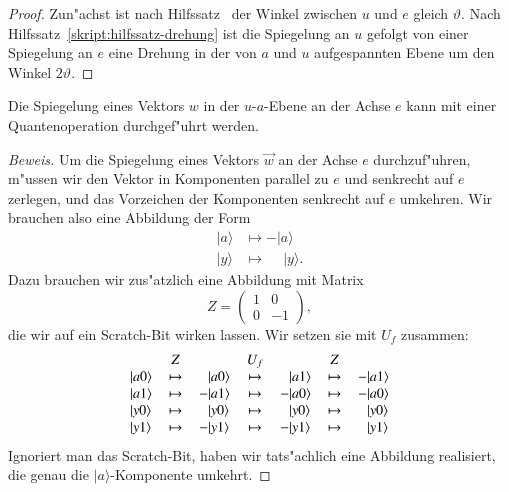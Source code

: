 \begin{proof}
Zun"achst ist nach Hilfssatz~\label{skript:hilfssatz-winkel}
der Winkel zwischen $u$ und $e$ gleich $\vartheta$.
Nach Hilfssatz~\ref{skript:hilfssatz-drehung} ist die Spiegelung
an $u$ gefolgt von einer Spiegelung an $e$ eine Drehung in der
von $a$ und $u$ aufgespannten Ebene um den Winkel $2\vartheta$.
\end{proof}

\begin{hilfssatz}
Die Spiegelung eines Vektors $w$ in der $u$-$a$-Ebene an
der Achse $e$ kann mit einer Quantenoperation durchgef"uhrt werden.
\label{skript:hilfssatz-spiegelung-e}
\end{hilfssatz}

\begin{proof}[Beweis]
Um die Spiegelung eines Vektors $\vec w$ an der Achse $e$ durchzuf"uhren,
m"ussen wir den Vektor in Komponenten parallel zu $e$ und senkrecht
auf $e$ zerlegen, und das Vorzeichen der Komponenten senkrecht auf
$e$ umkehren.
Wir brauchen also eine Abbildung der Form
\begin{align*}
|a\rangle&\mapsto -|a\rangle\\
|y\rangle&\mapsto \phantom{-}|y\rangle.
\end{align*}
Dazu brauchen wir zus"atzlich eine Abbildung mit Matrix
\[
Z=\begin{pmatrix}
1&0\\0&-1
\end{pmatrix},
\]
die wir auf ein Scratch-Bit wirken lassen.
Wir setzen sie mit $U_f$ zusammen:
\begin{equation}
\begin{tabular}{
>{$}l<{$}
>{$}c<{$}
>{$}l<{$}
>{$}c<{$}
>{$}l<{$}
>{$}c<{$}
>{$}l<{$}
}
          &Z      &                     &U_f    &                     &Z      &                     \\
|a0\rangle&\mapsto&\phantom{-}|a0\rangle&\mapsto&\phantom{-}|a1\rangle&\mapsto&         - |a1\rangle\\
|a1\rangle&\mapsto&         - |a1\rangle&\mapsto&         - |a0\rangle&\mapsto&         - |a0\rangle\\
|y0\rangle&\mapsto&\phantom{-}|y0\rangle&\mapsto&\phantom{-}|y0\rangle&\mapsto&\phantom{-}|y0\rangle\\
|y1\rangle&\mapsto&         - |y1\rangle&\mapsto&         - |y1\rangle&\mapsto&\phantom{-}|y1\rangle
\end{tabular}
\end{equation}
Ignoriert man das Scratch-Bit, haben wir tats"achlich eine Abbildung realisiert,
die genau die $|a\rangle$-Komponente umkehrt.
\end{proof}

